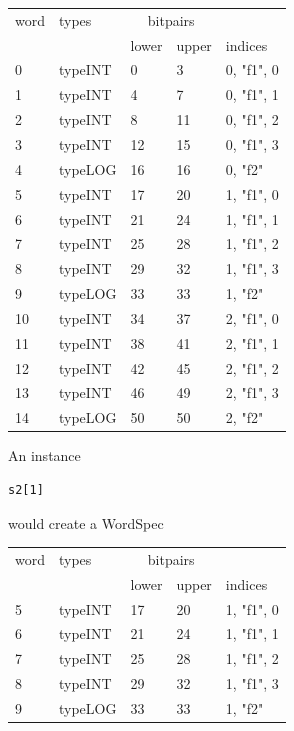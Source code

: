             \begin{tabular}{| l || l || l l | l |}
            \hline
            word  & types    & \multicolumn{2}{c|}{bitpairs} & \\
                  &          & lower & upper & indices \\
            \hline \hline
             0    & typeINT  & 0     & 3     & 0, "f1", 0  \\ \hline
             1    & typeINT  & 4     & 7     & 0, "f1", 1  \\ \hline
             2    & typeINT  & 8     & 11    & 0, "f1", 2  \\ \hline
             3    & typeINT  & 12    & 15    & 0, "f1", 3  \\ \hline
             4    & typeLOG  & 16    & 16    & 0, "f2"     \\ \hline
             5    & typeINT  & 17    & 20    & 1, "f1", 0  \\ \hline
             6    & typeINT  & 21    & 24    & 1, "f1", 1  \\ \hline
             7    & typeINT  & 25    & 28    & 1, "f1", 2  \\ \hline
             8    & typeINT  & 29    & 32    & 1, "f1", 3  \\ \hline
             9    & typeLOG  & 33    & 33    & 1, "f2"     \\ \hline
            10    & typeINT  & 34    & 37    & 2, "f1", 0  \\ \hline
            11    & typeINT  & 38    & 41    & 2, "f1", 1  \\ \hline
            12    & typeINT  & 42    & 45    & 2, "f1", 2  \\ \hline
            13    & typeINT  & 46    & 49    & 2, "f1", 3  \\ \hline
            14    & typeLOG  & 50    & 50    & 2, "f2"     \\ \hline
            \end{tabular}

            An instance
            \begin{lstlisting}[gobble=12, language=threepl]
                s2[1]
            \end{lstlisting}
            would create a WordSpec

            \begin{tabular}{| l || l || l l | l |}
            \hline
            word  & types    & \multicolumn{2}{c|}{bitpairs} & \\
                  &          & lower & upper & indices \\
            \hline \hline
             5    & typeINT  & 17    & 20    & 1, "f1", 0  \\ \hline
             6    & typeINT  & 21    & 24    & 1, "f1", 1  \\ \hline
             7    & typeINT  & 25    & 28    & 1, "f1", 2  \\ \hline
             8    & typeINT  & 29    & 32    & 1, "f1", 3  \\ \hline
             9    & typeLOG  & 33    & 33    & 1, "f2"     \\ \hline
            \end{tabular}

